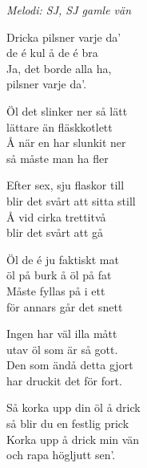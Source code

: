 {\footnotesize\textit{Melodi: SJ, SJ gamle vän}}\par
\vspace{10pt}
Dricka pilsner varje da'\\
de é kul å de é bra\\
Ja, det borde alla ha,\\
pilsner varje da'.\par
\vspace{10pt}
Öl det slinker ner så lätt\\
lättare än fläskkotlett\\
Å när en har slunkit ner\\
så måste man ha fler\par
\vspace{10pt}
Efter sex, sju flaskor till\\
blir det svårt att sitta still\\
Å vid cirka trettitvå\\
blir det svårt att gå\par
\vspace{10pt}
Öl de é ju faktiskt mat\\
öl på burk å öl på fat\\
Måste fyllas på i ett\\
för annars går det snett\par
\vspace{10pt}
Ingen har väl illa mått\\
utav öl som är så gott.\\
Den som ändå detta gjort\\
har druckit det för fort.\par
\vspace{10pt}
Så korka upp din öl å drick\\
så blir du en festlig prick\\
Korka upp å drick min vän\\
och rapa högljutt sen'.
